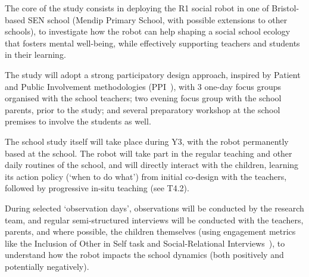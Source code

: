 The core of the study consists in deploying the R1 social robot in one of
Bristol-based SEN school (Mendip Primary School, with possible extensions to
other schools), to investigate how the robot can help shaping a social school
ecology that fosters mental well-being, while effectively supporting teachers
and students in their learning. 

The study will adopt a strong participatory design approach, inspired by
Patient and Public Involvement methodologies (PPI~\cite{boivin2010patient}),
with 3 one-day focus groups organised with the school teachers; two evening focus group with the
school parents, prior to the study; and several preparatory workshop at the
school premises to involve the students as well.



The school study itself will take place during Y3, with the robot permanently
based at the school. The robot will take part in the
regular teaching and other daily routines of the school, and will directly
interact with the children, learning its action policy (`when to do what') from
initial co-design with the teachers, followed by progressive in-situ teaching (see
T4.2).

During selected `observation days', observations will be conducted by the
research team, and regular semi-structured interviews will be conducted with the
teachers, parents, and where possible, the children themselves (using engagement
metrics like the Inclusion of Other in Self task and Social-Relational
Interviews~\cite{westlund2017measuring}), to understand how the robot impacts
the school dynamics  (both positively and potentially negatively).

